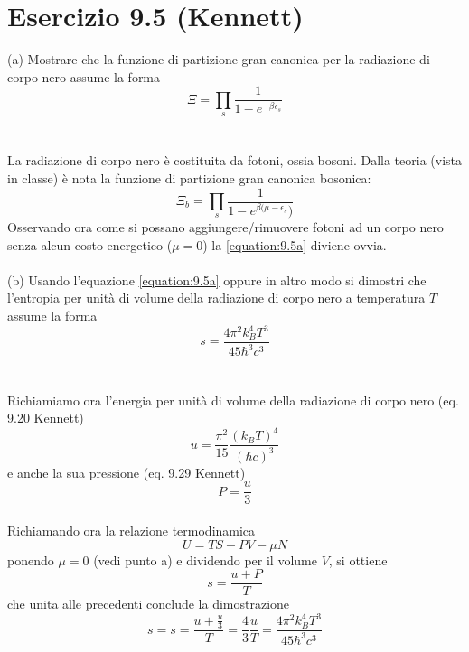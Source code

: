 \documentclass[a4paper]{article}
\begin{document}
    \section*{Esercizio 9.5 (Kennett)}
        (a) Mostrare che la funzione di partizione gran canonica per la radiazione di corpo nero assume la forma
        \begin{equation}
            \Xi=\prod_s\frac{1}{1-e^{-\beta\epsilon_s}}
            \label{equation:9.5a}
        \end{equation}
        \\
        \\
        La radiazione di corpo nero è costituita da fotoni, ossia bosoni.
        Dalla teoria (vista in classe) è nota la funzione di partizione gran canonica bosonica:
        \begin{equation*}
            \Xi_b=\prod_s\frac{1}{1-e^{\beta(\mu-\epsilon_s})}
        \end{equation*}
        Osservando ora come si possano aggiungere/rimuovere fotoni ad un corpo nero senza alcun costo energetico ($\mu=0$) la \ref{equation:9.5a} diviene ovvia.
        \\
        \\
        (b) Usando l'equazione \ref{equation:9.5a} oppure in altro modo si dimostri che l'entropia per unità di volume della radiazione di corpo nero a temperatura $T$ assume la forma
        \begin{equation}
            s=\frac{4\pi^2k_B^4T^3}{45\hbar^3c^3}
        \end{equation}
        \\
        \\
        Richiamiamo ora l'energia per unità di volume della radiazione di corpo nero (eq. 9.20 Kennett)
        \begin{equation*}
            u=\frac{\pi^2}{15}\frac{(k_BT)^4}{(\hbar c)^3}
        \end{equation*}
        e anche la sua pressione (eq. 9.29 Kennett)
        \begin{equation*}
            P=\frac{u}{3}
        \end{equation*}
        \\
        Richiamando ora la relazione termodinamica
        \begin{equation}
            U=TS-PV-\mu N
        \end{equation}
        ponendo $\mu=0$ (vedi punto a) e dividendo per il volume $V$, si ottiene
        \begin{equation*}
            s=\frac{u+P}{T}
        \end{equation*}
        che unita alle precedenti conclude la dimostrazione
        \begin{equation*}
            s=s=\frac{u+\frac{u}{3}}{T}=\frac{4}{3}\frac{u}{T}=\frac{4\pi^2k_B^4T^3}{45\hbar^3c^3}
        \end{equation*}
\end{document}
